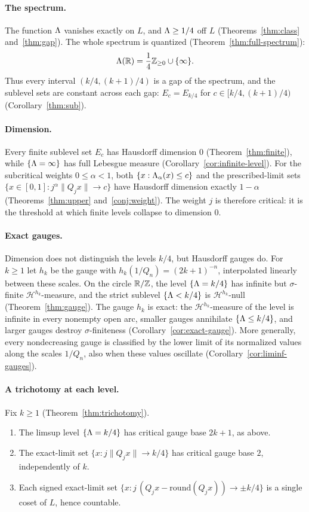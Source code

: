 \paragraph{The spectrum.} The function $\Lambda$ vanishes exactly on $L$, and
$\Lambda\ge1/4$ off $L$ (Theorems~\ref{thm:class} and~\ref{thm:gap}). The
whole spectrum is quantized (Theorem~\ref{thm:full-spectrum}):
\[
\Lambda(\mathbb{R})=\frac14\mathbb{Z}_{\ge0}\cup\{\infty\}.
\]
Thus every interval $(k/4,(k+1)/4)$ is a gap of the spectrum, and the sublevel
sets are constant across each gap: $E_c=E_{k/4}$ for $c\in[k/4,(k+1)/4)$
(Corollary~\ref{thm:sub}).

\paragraph{Dimension.} Every finite sublevel set $E_c$ has Hausdorff dimension
$0$ (Theorem~\ref{thm:finite}), while $\{\Lambda=\infty\}$ has full Lebesgue
measure (Corollary~\ref{cor:infinite-level}). For the subcritical weights
$0\le\alpha<1$, both $\{x:\Lambda_\alpha(x)\le c\}$ and the prescribed-limit sets
$\{x\in[0,1]:j^\alpha\|Q_jx\|\to c\}$ have Hausdorff dimension exactly
$1-\alpha$ (Theorems~\ref{thm:upper} and~\ref{conj:weight}). The weight $j$ is
therefore critical: it is the threshold at which finite levels collapse to
dimension $0$.

\paragraph{Exact gauges.} Dimension does not distinguish the levels $k/4$, but
Hausdorff gauges do. For $k\ge1$ let $h_k$ be the gauge with
$h_k(1/Q_n)=(2k+1)^{-n}$, interpolated linearly between these scales. On the
circle $\mathbb{R}/\mathbb{Z}$, the level $\{\Lambda=k/4\}$ has infinite but $\sigma$-finite
$\mathcal H^{h_k}$-measure, and the strict sublevel $\{\Lambda<k/4\}$ is
$\mathcal H^{h_k}$-null (Theorem~\ref{thm:gauge}). The gauge $h_k$ is exact:
the $\mathcal H^{h_k}$-measure of the level is infinite in every nonempty open
arc, smaller gauges annihilate $\{\Lambda\le k/4\}$, and larger gauges destroy
$\sigma$-finiteness (Corollary~\ref{cor:exact-gauge}). More generally, every
nondecreasing gauge is classified by the lower limit of its normalized values
along the scales $1/Q_n$, also when these values oscillate
(Corollary~\ref{cor:liminf-gauges}).

\paragraph{A trichotomy at each level.} Fix $k\ge1$ (Theorem~\ref{thm:trichotomy}).
\begin{enumerate}[label=(\roman*),leftmargin=2em]
\item The limsup level $\{\Lambda=k/4\}$ has critical gauge base $2k+1$, as above.
\item The exact-limit set $\{x:j\|Q_jx\|\to k/4\}$ has critical gauge base $2$,
independently of $k$.
\item Each signed exact-limit set
$\{x:j\,(Q_jx-\mathrm{round}(Q_jx))\to\pm k/4\}$ is a single coset of $L$, hence
countable.
\end{enumerate}

